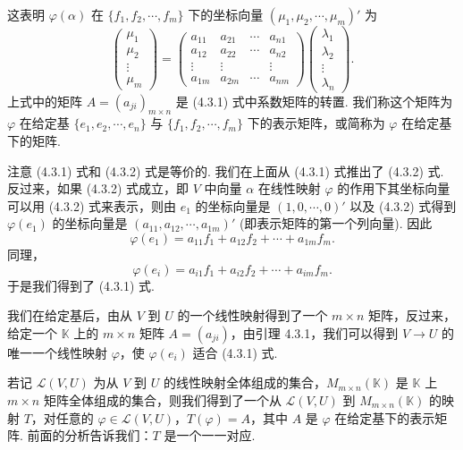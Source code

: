\documentclass[UTF8, 12pt, fontset=fandol, oneside]{ctexart}
\begin{document}
这表明 $\varphi(\alpha)$ 在 $\{f_1,f_2,\cdots,f_m\}$ 下的坐标向量 $(\mu_1,\mu_2,\cdots,\mu_m)'$ 为
\begin{equation}
\left(\begin{array}{c}
\mu_1\\
\mu_2\\
\vdots\\
\mu_m
\end{array}\right)
=
\left(\begin{array}{cccc}
a_{11} & a_{21} & \cdots & a_{n1}\\
a_{12} & a_{22} & \cdots & a_{n2}\\
\vdots & \vdots & & \vdots\\
a_{1m} & a_{2m} & \cdots & a_{nm}
\end{array}\right)
\left(\begin{array}{c}
\lambda_1\\
\lambda_2\\
\vdots\\
\lambda_n
\end{array}\right).
\tag{4.3.2}
\end{equation}
上式中的矩阵 $A=(a_{ji})_{m\times n}$ 是 (4.3.1) 式中系数矩阵的转置. 我们称这个矩阵为 $\varphi$ 在给定基 $\{e_1,e_2,\cdots,e_n\}$ 与 $\{f_1,f_2,\cdots,f_m\}$ 下的表示矩阵，或简称为 $\varphi$ 在给定基下的矩阵.

注意 (4.3.1) 式和 (4.3.2) 式是等价的. 我们在上面从 (4.3.1) 式推出了 (4.3.2) 式. 反过来，如果 (4.3.2) 式成立，即 $V$ 中向量 $\alpha$ 在线性映射 $\varphi$ 的作用下其坐标向量可以用 (4.3.2) 式来表示，则由 $e_1$ 的坐标向量是 $(1,0,\cdots,0)'$ 以及 (4.3.2) 式得到 $\varphi(e_1)$ 的坐标向量是 $(a_{11},a_{12},\cdots,a_{1m})'$ (即表示矩阵的第一个列向量). 因此
\[
\varphi(e_1)=a_{11}f_1+a_{12}f_2+\cdots+a_{1m}f_m.
\]
同理，
\[
\varphi(e_i)=a_{i1}f_1+a_{i2}f_2+\cdots+a_{im}f_m.
\]
于是我们得到了 (4.3.1) 式.

我们在给定基后，由从 $V$ 到 $U$ 的一个线性映射得到了一个 $m\times n$ 矩阵，反过来，给定一个 $\mathbb{K}$ 上的 $m\times n$ 矩阵 $A=(a_{ji})$，由引理 4.3.1，我们可以得到 $V\to U$ 的唯一一个线性映射 $\varphi$，使 $\varphi(e_i)$ 适合 (4.3.1) 式.

若记 $\mathcal{L}(V,U)$ 为从 $V$ 到 $U$ 的线性映射全体组成的集合，$M_{m\times n}(\mathbb{K})$ 是 $\mathbb{K}$ 上 $m\times n$ 矩阵全体组成的集合，则我们得到了一个从 $\mathcal{L}(V,U)$ 到 $M_{m\times n}(\mathbb{K})$ 的映射 $T$，对任意的 $\varphi\in\mathcal{L}(V,U)$，$T(\varphi)=A$，其中 $A$ 是 $\varphi$ 在给定基下的表示矩阵. 前面的分析告诉我们：$T$ 是一个一一对应.
\end{document}
